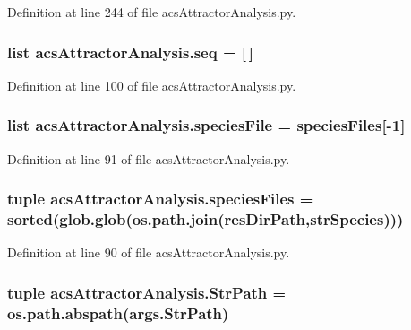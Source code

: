 Definition at line 244 of file acs\-Attractor\-Analysis.\-py.

\hypertarget{a00122_a33bc0e3fc99bab3df33d3f1626a19528}{
\subsubsection[{seq}]{\setlength{\rightskip}{0pt plus 5cm}list acs\-Attractor\-Analysis.\-seq = \mbox{[}$\,$\mbox{]}}}\label{a00122_a33bc0e3fc99bab3df33d3f1626a19528}


Definition at line 100 of file acs\-Attractor\-Analysis.\-py.

\hypertarget{a00122_a0e036b776f4f724254115c2e284657eb}{
\subsubsection[{species\-File}]{\setlength{\rightskip}{0pt plus 5cm}list acs\-Attractor\-Analysis.\-species\-File = {\bf species\-Files}\mbox{[}-\/1\mbox{]}}}\label{a00122_a0e036b776f4f724254115c2e284657eb}


Definition at line 91 of file acs\-Attractor\-Analysis.\-py.

\hypertarget{a00122_a670249d163388a9d93c8f3b9fb63afac}{
\subsubsection[{species\-Files}]{\setlength{\rightskip}{0pt plus 5cm}tuple acs\-Attractor\-Analysis.\-species\-Files = sorted(glob.\-glob(os.\-path.\-join({\bf res\-Dir\-Path},{\bf str\-Species})))}}\label{a00122_a670249d163388a9d93c8f3b9fb63afac}


Definition at line 90 of file acs\-Attractor\-Analysis.\-py.

\hypertarget{a00122_a8941499f40259763765b64e3185be82c}{
\subsubsection[{Str\-Path}]{\setlength{\rightskip}{0pt plus 5cm}tuple acs\-Attractor\-Analysis.\-Str\-Path = os.\-path.\-abspath(args.\-Str\-Path)}}\label{a00122_a8941499f40259763765b64e3185be82c}


